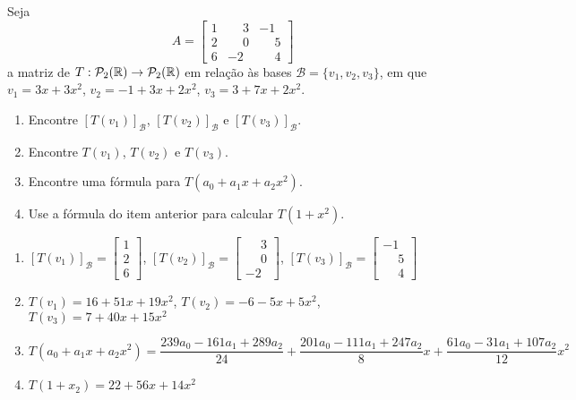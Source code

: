 \documentclass[12pt]{exam}
\begin{document}
\begin{exercicio}
    Seja
    \[
        A = \begin{bmatrix}
            1 & \phantom{-}3 & -1\\
            2 & \phantom{-}0 & \phantom{-}5\\
            6 & -2 & \phantom{-}4
        \end{bmatrix}
    \]
    a matriz de $T : \mathcal{P}_2(\mathbb{R}) \to \mathcal{P}_2(\mathbb{R})$ em relação às bases $\mathcal{B} = \{v_1, v_2, v_3\}$, em que $v_1 = 3x + 3x^2$, $v_2 = -1 + 3x + 2x^2$, $v_3 = 3 + 7x + 2x^2$.
    \begin{enumerate}[label={\alph*})]
        \item Encontre $[T(v_1)]_\mathcal{B}$, $[T(v_2)]_\mathcal{B}$ e $[T(v_3)]_\mathcal{B}$.

        \item Encontre $T(v_1)$, $T(v_2)$ e $T(v_3)$.

        \item Encontre uma fórmula para $T(a_0 + a_1x + a_2x^2)$.

        \item Use a fórmula do item anterior para calcular $T(1 + x^2)$.
    \end{enumerate}

    \begin{solucao}
        \begin{enumerate}[label={\alph*})]
            \item $[T(v_1)]_\mathcal{B} = \begin{bmatrix} 1\\2\\6\end{bmatrix}$, $[T(v_2)]_\mathcal{B} = \begin{bmatrix}\phantom{-}3\\\phantom{-}0\\-2\end{bmatrix}$, $[T(v_3)]_\mathcal{B} = \begin{bmatrix} -1\\\phantom{-}5\\\phantom{-}4\end{bmatrix}$

            \item $T(v_1) = 16 + 51x + 19x^2$, $T(v_2) = -6 - 5x + 5x^2$, $T(v_3) = 7 + 40x + 15x^2$

            \item $T(a_0 + a_1x + a_2x^2) = \dfrac{239a_0 - 161a_1 + 289a_2}{24} +\dfrac{201a_0 - 111a_1 + 247a_2}{8}x + \dfrac{61a_0 - 31a_1 + 107a_2}{12}x^2$

            \item $T(1 + x_2) = 22 + 56x + 14x^2$
        \end{enumerate}
    \end{solucao}
\end{exercicio}
\end{document}
